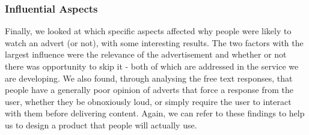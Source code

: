\subsubsection{Influential Aspects}
Finally, we looked at which specific aspects affected why people were likely to watch an advert (or not), with some interesting results. The two factors with the largest influence were the relevance of the advertisement and whether or not there was opportunity to skip it - both of which are addressed in the service we are developing. We also found, through analysing the free text responses, that people have a generally poor opinion of adverts that force a response from the user, whether they be obnoxiously loud, or simply require the user to interact with them before delivering content. Again, we can refer to these findings to help us to design a product that people will actually use. 
